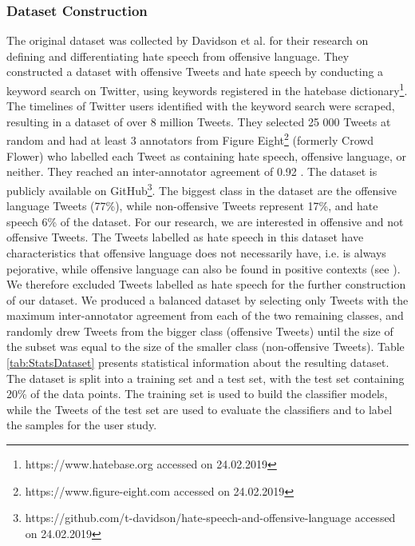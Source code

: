 \subsubsection{Dataset Construction}
The original dataset was collected by Davidson et al. \cite{davidson2017automated} for their research on defining and differentiating hate speech from offensive language. They constructed a dataset with offensive Tweets and hate speech by conducting a keyword search on Twitter, using keywords registered in the hatebase dictionary\footnote{https://www.hatebase.org accessed on 24.02.2019}. The timelines of Twitter users identified with the keyword search were scraped, resulting in a dataset of over 8 million Tweets. They selected 25 000 Tweets at random and had at least 3 annotators from Figure Eight\footnote{https://www.figure-eight.com accessed on 24.02.2019} (formerly Crowd Flower) who labelled each Tweet as containing hate speech, offensive language, or neither. They reached an inter-annotator agreement of 0.92 \cite{davidson2017automated}. The dataset is publicly available on GitHub\footnote{https://github.com/t-davidson/hate-speech-and-offensive-language accessed on 24.02.2019}.\newline
The biggest class in the dataset are the offensive language Tweets (77\%), while non-offensive Tweets represent 17\%, and hate speech 6\% of the dataset. \newline
For our research, we are interested in offensive and not offensive Tweets. The Tweets labelled as hate speech in this dataset have characteristics that offensive language does not necessarily have, i.e. is always pejorative, while offensive language can also be found in positive contexts (see \cite{davidson2017automated}). We therefore excluded Tweets labelled as hate speech for the further construction of our dataset. We produced a balanced dataset by selecting only Tweets with the maximum inter-annotator agreement from each of the two remaining classes, and randomly drew Tweets from the bigger class (offensive Tweets) until the size of the subset was equal to the size of the smaller class (non-offensive Tweets). Table \ref{tab:StatsDataset} presents statistical information about the resulting dataset.\newline
The dataset is split into a training set and a test set, with the test set containing 20\% of the data points. The training set is used to build the classifier models, while the Tweets of the test set are used to evaluate the classifiers and to label the samples for the user study.
